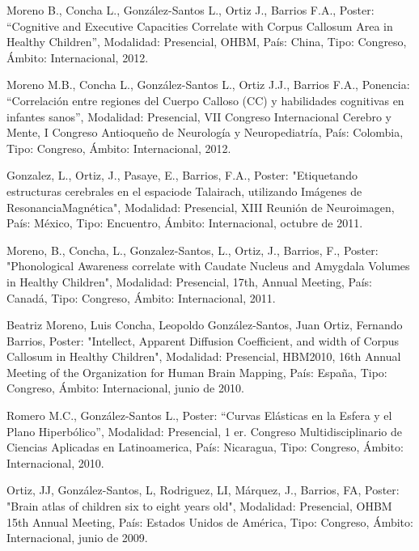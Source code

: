 \item  Moreno B., Concha L., González-Santos L., Ortiz J., Barrios F.A., Poster: “Cognitive and Executive Capacities 
Correlate 
with Corpus Callosum Area in Healthy Children”, Modalidad: Presencial, OHBM, País: China, Tipo: Congreso, Ámbito: 
Internacional, 2012.

\item  Moreno M.B., Concha L., González-Santos L., Ortiz J.J., Barrios F.A., Ponencia: “Correlación entre regiones del Cuerpo 
Calloso (CC) y habilidades cognitivas en infantes sanos”, Modalidad: Presencial, VII Congreso Internacional Cerebro y Mente, 
I Congreso Antioqueño de Neurología y Neuropediatría, País: Colombia, Tipo: Congreso, Ámbito: Internacional, 2012.

\item  Gonzalez, L., Ortiz, J., Pasaye, E., Barrios, F.A., Poster: "Etiquetando estructuras cerebrales en el espaciode 
Talairach, utilizando Imágenes de ResonanciaMagnética", Modalidad: Presencial, XIII Reunión de Neuroimagen, País: México, 
Tipo: Encuentro, Ámbito: Internacional, octubre de 2011.

\item  Moreno, B., Concha, L., Gonzalez-Santos, L., Ortiz, J., Barrios, F., Poster: "Phonological Awareness correlate with 
Caudate Nucleus and Amygdala Volumes in Healthy Children", Modalidad: Presencial, 17th, Annual Meeting, País: Canadá, Tipo: 
Congreso, Ámbito: Internacional, 2011.

\item  Beatriz Moreno, Luis Concha, Leopoldo González-Santos, Juan Ortiz, Fernando Barrios, Poster: "Intellect, Apparent 
Diffusion Coefficient, and width of Corpus Callosum in Healthy Children", Modalidad: Presencial, HBM2010, 16th Annual Meeting 
of the Organization for Human Brain Mapping, País: España, Tipo: Congreso, Ámbito: Internacional, junio de 2010.

\item  Romero M.C., González-Santos L., Poster: “Curvas Elásticas en la Esfera y el Plano Hiperbólico”, Modalidad: 
Presencial, 1 
er. Congreso Multidisciplinario de Ciencias Aplicadas en Latinoamerica, País: Nicaragua, Tipo: Congreso, Ámbito: 
Internacional, 2010.

\item  Ortiz, JJ, González-Santos, L, Rodriguez, LI, Márquez, J., Barrios, FA, Poster: "Brain atlas of children six to eight 
years old", Modalidad: Presencial, OHBM 15th Annual Meeting, País: Estados Unidos de América, Tipo: Congreso, Ámbito: 
Internacional, junio de 2009.

